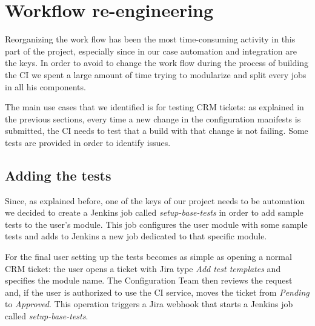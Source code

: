 \section{Workflow re-engineering}

Reorganizing the work flow has been the most time-consuming activity in
this part of the project, especially since in our case automation and
integration are the keys. In order to avoid to change the work flow during
the process of building the CI we spent a large amount of time trying to
modularize and split every jobs in all his components.

The main use cases that we identified is for testing CRM tickets: as
explained in the previous sections, every time a new change in the
configuration manifests is submitted, the CI needs to test that a build
with that change is not failing. Some tests are provided in order to
identify issues.
  
\subsection{Adding the tests}

Since, as explained before, one of the keys of our project needs to be
automation we decided to create a Jenkins job called
\textit{setup-base-tests} in order to add sample tests to the user's
module. This job configures the user module with some sample tests and
adds to Jenkins a new job dedicated to that specific module.

For the final user setting up the tests becomes as simple as opening
a normal CRM ticket: the user opens a ticket with Jira type \textit{Add
test templates} and specifies the module name. The Configuration Team then
reviews the request and, if the user is authorized to use the CI service,
moves the ticket from \textit{Pending} to \textit{Approved}. This
operation triggers a Jira webhook that starts a Jenkins job called
\textit{setup-base-tests}.

